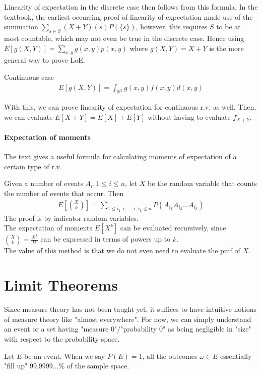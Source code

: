 \documentclass{article}
\begin{document}
Linearity of expectation in the discrete case then follows from this formula. In the textbook, the earliest occurring proof of linearity of expectation made use of the summation $\sum_{s\in S}(X+Y)(s)P(\{s\})$, however, this requires $S$ to be at most countable, which may not even be true in the discrete case. Hence using $E[g(X, Y)] = \sum_{x,y}g(x,y)p(x,y)$ where $g(X,Y) = X+Y$ is the more general way to prove LoE.

Continuous case
\begin{align*}
	E[g(X, Y)] = \int_{\mathbb{R}^2}g(x,y)f(x,y)d(x,y)
\end{align*}

With this, we can prove linearity of expectation for continuous r.v. as well. Then, we can evaluate $E[X+Y] = E[X] + E[Y]$ without having to evaluate $f_{X+Y}$.

\paragraph{Expectation of moments} The text gives a useful formula for calculating moments of expectation of a certain type of r.v.

Given a number of events $A_i, 1\leq i\leq n$, let $X$ be the random variable that counts the number of events that occur. Then 
\begin{align*}
	E\left[\binom{X}{k}\right] = \sum_{1\leq i_1<\dots<i_k\leq n}P(A_{i_1}A_{i_2}\dots A_{i_k})
\end{align*}
The proof is by indicator random variables.\\
The expectation of moments $E[X^k]$ can be evaluated recursively, since $\binom{X}{k} = \frac{X^{\underline{k}}}{k!}$ can be expressed in terms of powers up to $k$.\\
The value of this method is that we do not even need to evaluate the pmf of $X$.

\section{Limit Theorems}
Since measure theory has not been taught yet, it suffices to have intuitive notions of measure theory like "almost everywhere". For now, we can simply understand an event or a set having "measure 0"/"probability 0" as being negligible in "size" with respect to the probability space.

Let $E$ be an event. When we say $P(E)=1$, all the outcomes $\omega \in E$ essentially "fill up" 99.9999...\% of the sample space.
\end{document}
